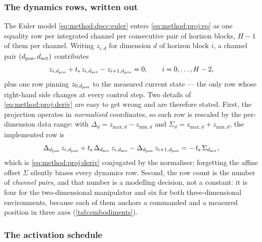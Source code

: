 \subsubsection*{The dynamics rows, written out}

The Euler model \eqref{eq:method:dpcc:euler} enters \eqref{eq:method:proj:eq} as one equality row per
integrated channel per consecutive pair of horizon blocks, $H-1$ of them per channel. Writing $z_{i,d}$ for dimension $d$ of horizon block $i$, a
channel pair $(d_{\textrm{pos}},d_{\textrm{act}})$ contributes
\begin{equation}\label{eq:method:proj:deriv}
  z_{i,d_{\textrm{pos}}} + t_{\textrm{s}}\,z_{i,d_{\textrm{act}}} - z_{i+1,d_{\textrm{pos}}} = 0,
  \qquad i = 0,\dots,H-2,
\end{equation}
plus one row pinning $z_{0,d_{\textrm{pos}}}$ to the measured current state --- the only row whose
right-hand side changes at every control step. Two details of \eqref{eq:method:proj:deriv} are easy
to get wrong and are therefore stated. First, the projection operates in \emph{normalised}
coordinates, so each row is rescaled by the per-dimension data range: with
$\Delta_{d} = z_{\textrm{max},d} - z_{\textrm{min},d}$ and
$\Sigma_{d} = z_{\textrm{max},d} + z_{\textrm{min},d}$, the implemented row is
\begin{equation}\label{eq:method:proj:derivnorm}
  \Delta_{d_{\textrm{pos}}}\,z_{i,d_{\textrm{pos}}}
  + t_{\textrm{s}}\,\Delta_{d_{\textrm{act}}}\,z_{i,d_{\textrm{act}}}
  - \Delta_{d_{\textrm{pos}}}\,z_{i+1,d_{\textrm{pos}}}
  = -\,t_{\textrm{s}}\,\Sigma_{d_{\textrm{act}}} ,
\end{equation}
which is \eqref{eq:method:proj:deriv} conjugated by the normaliser; forgetting the affine offset
$\Sigma$ silently biases every dynamics row. Second, the row count is the number of
\emph{channel pairs}, and that number is a modelling decision, not a constant: it is four for the
two-dimensional manipulator and six for both three-dimensional environments, because each of them
anchors a commanded and a measured position in three axes
(\autoref{tab:embodiments}).

\subsubsection*{The activation schedule}

